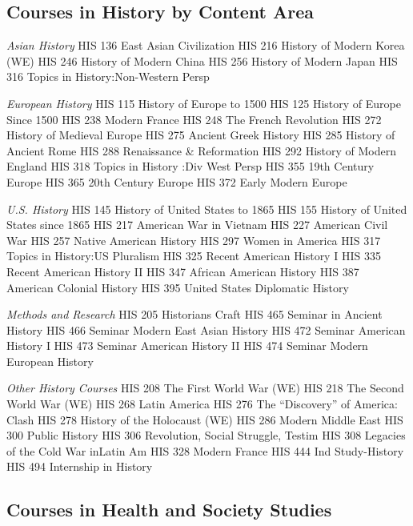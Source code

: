 \documentclass[
  letterpaper,
]{scrbook}
\begin{document}
\subsection{Courses in History by Content
Area}\label{courses-in-history-by-content-area}

\emph{Asian History} HIS 136 East Asian Civilization HIS 216 History of
Modern Korea (WE) HIS 246 History of Modern China HIS 256 History of
Modern Japan HIS 316 Topics in History:Non-Western Persp

\emph{European History} HIS 115 History of Europe to 1500 HIS 125
History of Europe Since 1500 HIS 238 Modern France HIS 248 The French
Revolution HIS 272 History of Medieval Europe HIS 275 Ancient Greek
History HIS 285 History of Ancient Rome HIS 288 Renaissance \&
Reformation HIS 292 History of Modern England HIS 318 Topics in History
:Div West Persp HIS 355 19th Century Europe HIS 365 20th Century Europe
HIS 372 Early Modern Europe

\emph{U.S. History} HIS 145 History of United States to 1865 HIS 155
History of United States since 1865 HIS 217 American War in Vietnam HIS
227 American Civil War HIS 257 Native American History HIS 297 Women in
America HIS 317 Topics in History:US Pluralism HIS 325 Recent American
History I HIS 335 Recent American History II HIS 347 African American
History HIS 387 American Colonial History HIS 395 United States
Diplomatic History

\emph{Methods and Research} HIS 205 Historians Craft HIS 465 Seminar in
Ancient History HIS 466 Seminar Modern East Asian History HIS 472
Seminar American History I HIS 473 Seminar American History II HIS 474
Seminar Modern European History

\emph{Other History Courses} HIS 208 The First World War (WE) HIS 218
The Second World War (WE) HIS 268 Latin America HIS 276 The
``Discovery'' of America: Clash HIS 278 History of the Holocaust (WE)
HIS 286 Modern Middle East HIS 300 Public History HIS 306 Revolution,
Social Struggle, Testim HIS 308 Legacies of the Cold War inLatin Am HIS
328 Modern France HIS 444 Ind Study-History HIS 494 Internship in
History

\subsection{Courses in Health and Society
Studies}\label{courses-in-health-and-society-studies}
\end{document}
